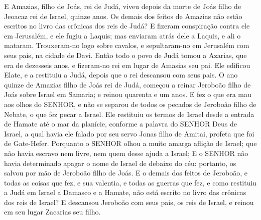{  E Amazias, filho de Joás, rei de Judá, viveu depois da morte de Joás filho de Jeoacaz rei de Israel, quinze anos.
  Os demais dos feitos de Amazias não estão escritos no livro das crônicas dos reis de Judá?
  E fizeram conspiração contra ele em Jerusalém, e ele fugiu a Laquis; mas enviaram atrás dele a Laquis, e ali o mataram.
  Trouxeram-no logo sobre cavalos, e sepultaram-no em Jerusalém com seus pais, na cidade de Davi.
  Então todo o povo de Judá tomou a Azarias, que era de dezesseis anos, e fizeram-no rei em lugar de Amasias seu pai.
  Ele edificou Elate, e a restituiu a Judá, depois que o rei descansou com seus pais.
  O ano quinze de Amazias filho de Joás rei de Judá, começou a reinar Jeroboão filho de Joás sobre Israel em Samaria; e reinou quarenta e um anos.
  E fez o que era mau aos olhos do SENHOR, e não se separou de todos os pecados de Jeroboão filho de Nebate, o que fez pecar a Israel.
  Ele restituiu os termos de Israel desde a entrada de Hamate até o mar da planície, conforme a palavra do SENHOR Deus de Israel, a qual havia ele falado por seu servo Jonas filho de Amitai, profeta que foi de Gate-Hefer. %
  Porquanto o SENHOR olhou a muito amarga aflição de Israel; que não havia escravo nem livre, nem quem desse ajuda a Israel;
  E o SENHOR não havia determinado apagar o nome de Israel de debaixo do céu: portanto, os salvou por mão de Jeroboão filho de Joás.
  E o demais dos feitos de Jeroboão, e todas as coisas que fez, e sua valentia, e todas as guerras que fez, e como restituiu a Judá em Israel a Damasco e a Hamate, não está escrito no livro das crônicas dos reis de Israel?
  E descansou Jeroboão com seus pais, os reis de Israel, e reinou em seu lugar Zacarias seu filho.
\par }


